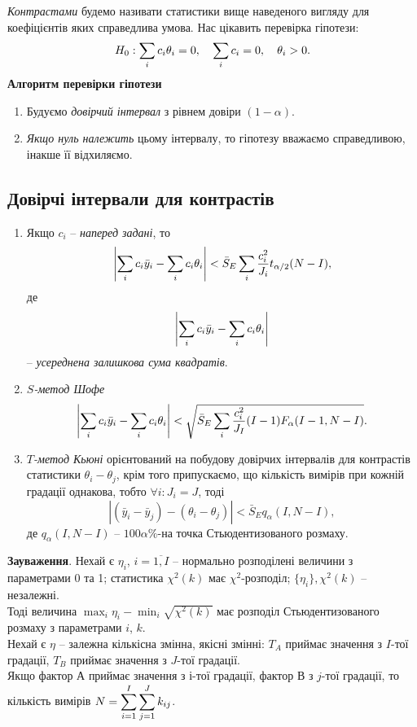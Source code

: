 \textit{Контрастами} будемо називати статистики вище наведеного вигляду для коефіцієнтів яких справедлива умова. Нас цікавить перевірка гіпотези: \[H_0: \displaystyle\sum\limits_i c_i\theta_i=0, \quad \displaystyle\sum\limits_ic_i=0, \quad \theta_i>0.\]
\textbf{Алгоритм перевірки гіпотези}
\begin{enumerate}
	\item Будуємо \textit{довірчий інтервал} з рівнем довіри $(1-\alpha)$.
	\item \textit{Якщо нуль належить} цьому інтервалу, то гіпотезу вважаємо справедливою, інакше її відхиляємо.
\end{enumerate}
\subsection{Довірчі інтервали для контрастів}
\begin{enumerate}
	\item Якщо $c_i$ -- \textit{наперед задані}, то \[ \left|\displaystyle\sum\limits_ic_i\bar{y}_i-\displaystyle\sum\limits_ic_i\theta_i\right|<\bar{S}_E \displaystyle\sum\limits_i\dfrac{c_i^2}{J_i} t_{\alpha/2}(N-I), \] де \[\left|\displaystyle\sum\limits_ic_i\bar{y}_i-\displaystyle\sum\limits_ic_i\theta_i\right|\] -- \textit{усереднена залишкова сума квадратів}.
	\item \textit{$S$-метод Шофе} \[\left|\displaystyle\sum\limits_ic_i\bar{y}_i-\displaystyle\sum\limits_ic_i\theta_i\right|<\sqrt{\bar{S}_E\displaystyle\sum\limits_i\dfrac{c_i^2}{J_I}(I-1)F_\alpha(I-1,N-I)}. \]
	\item \textit{$T$-метод Кьюні} орієнтований на побудову довірчих інтервалів для контрастів статистики $\theta_i-\theta_j$, крім того припускаємо, що кількість вимірів при кожній градації однакова, тобто $\forall i: J_i = J$, тоді \[|(\bar{y}_i-\bar{y}_j)-(\theta_i-\theta_j)|<\bar{S}_Eq_\alpha(I,N-I),\] де $q_\alpha(I,N-I)$ -- $100\alpha\%$-на точка Стьюдентизованого розмаху.
\end{enumerate}
\textbf{Зауваження}. Нехай є $\eta_i$, $i =\overline{1, I}$ -- нормально розподілені величини з параметрами 0 та 1; статистика $\chi^2(k)$ має $\chi^2$-розподіл; $\{\eta_i\}, \chi^2(k)$ -- незалежні. \\

Тоді величина $\max_i \eta_i - \min_i \sqrt{\chi^2(k)}$ має розподіл Стьюдентизованого розмаху з параметрами $i$, $k$. \\

Нехай є $\eta$ -- залежна кількісна змінна, якісні змінні: $T_A$ приймає значення з $I$-тої градації, $T_B$ приймає значення з $J$-тої градації.\\

Якщо фактор $А$ приймає значення з $і$-тої градації, фактор $В$ з $j$-тої градації, то кількість
вимірів $N = \displaystyle\sum\limits_{i=1}^I \displaystyle\sum\limits_{j=1}^J k_{ij}$. \\

